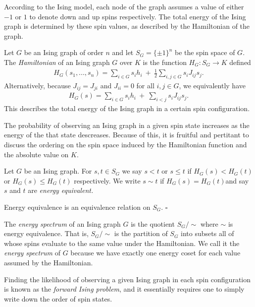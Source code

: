 According to the Ising model, each node of the graph assumes a value of either $-1$ or $1$ to denote down and up spins respectively. The total energy of the Ising graph is determined by these spin values, as described by the Hamiltonian of the graph.
\begin{defn}\label{defn:hamiltonian}
	Let $G$ be an Ising graph of order $n$ and let $S_G = \{\pm 1\}^n$ be the spin space of $G$. The \emph{Hamiltonian} of an Ising graph $G$ over $K$ is the function $H_G:S_G\to K$ defined
	\begin{align*}
		H_G(s_1,...,s_n) = \sum_{i \in G} s_ih_i ~+~ \frac{1}{2}\sum_{i,j \in G} s_i J_{ij}s_j.
	\end{align*}
	Alternatively, because $J_{ij} = J_{ji}$ and $J_{ii} = 0$ for all $i,j \in G$, we equivalently have
	\begin{align*}
		H_G(s) = \sum_{i\in G} s_ih_i ~+~ \sum_{i < j} s_i J_{ij}s_j.
	\end{align*}
	This describes the total energy of the Ising graph in a certain spin configuration.
\end{defn}

The probability of observing an Ising graph in a given spin state increases as the energy of the that state descreases. Because of this, it is fruitful and pertitant to discuss the ordering on the spin space induced by the Hamiltonian function and the absolute value on $K$.
\begin{defn}\label{defn:spin-ordering}
	Let $G$ be an Ising graph. For $s,t\in S_G$ we say $s < t$ or $s \leq t$ if $H_G(s) < H_G(t)$ or $H_G(s) \leq H_G(t)$ respectively. We write $s \sim t$ if $H_G(s) = H_G(t)$and say $s$ and $t$ are \emph{energy equivalent.}
\end{defn}
\begin{lem}\label{lem:energy-equiv}
	Energy equivalence is an equivalence relation on $S_G$. \hfill $\square$
\end{lem}
\begin{defn}\label{defn:energy-cosets}
	The \emph{energy spectrum} of an Ising graph $G$ is the quotient $S_G/\sim$ where $\sim$ is energy equivalence. That is, $S_G/\sim$ is the partition of $S_G$ into subsets all of whose spins evaluate to the same value under the Hamiltonian. We call it the \emph{energy spectrum} of $G$ because we have exactly one energy coset for each value assumed by the Hamiltonian.
\end{defn}
Finding the likelihood of observing a given Ising graph in each spin configuration is known as the \emph{forward Ising problem}, and it essentially requires one to simply write down the order of spin states.

